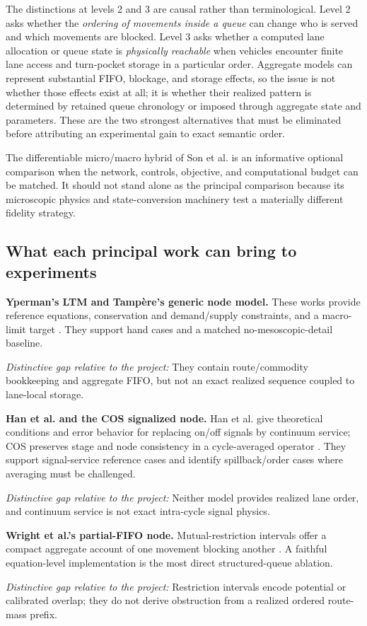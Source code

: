 \documentclass[11pt,a4paper]{article}
\newcommand{\gap}[1]{\par\smallskip\noindent\textit{Distinctive gap relative to the project:} #1}
\begin{document}
The distinctions at levels 2 and 3 are causal rather than terminological. Level 2 asks whether the \emph{ordering of movements inside a queue} can change who is served and which movements are blocked. Level 3 asks whether a computed lane allocation or queue state is \emph{physically reachable} when vehicles encounter finite lane access and turn-pocket storage in a particular order. Aggregate models can represent substantial FIFO, blockage, and storage effects, so the issue is not whether those effects exist at all; it is whether their realized pattern is determined by retained queue chronology or imposed through aggregate state and parameters. These are the two strongest alternatives that must be eliminated before attributing an experimental gain to exact semantic order.

The differentiable micro/macro hybrid of Son et al. \cite{son2022} is an informative optional comparison when the network, controls, objective, and computational budget can be matched. It should not stand alone as the principal comparison because its microscopic physics and state-conversion machinery test a materially different fidelity strategy.

\subsection{What each principal work can bring to experiments}

\textbf{Yperman's LTM and Tampère's generic node model.} These works provide reference equations, conservation and demand/supply constraints, and a macro-limit target \cite{yperman2007,tampere2011}. They support hand cases and a matched no-mesoscopic-detail baseline. \gap{They contain route/commodity bookkeeping and aggregate FIFO, but not an exact realized sequence coupled to lane-local storage.}

\textbf{Han et al. and the COS signalized node.} Han et al. give theoretical conditions and error behavior for replacing on/off signals by continuum service; COS preserves stage and node consistency in a cycle-averaged operator \cite{han2014,yahya2023}. They support signal-service reference cases and identify spillback/order cases where averaging must be challenged. \gap{Neither model provides realized lane order, and continuum service is not exact intra-cycle signal physics.}

\textbf{Wright et al.'s partial-FIFO node.} Mutual-restriction intervals offer a compact aggregate account of one movement blocking another \cite{wright2017}. A faithful equation-level implementation is the most direct structured-queue ablation. \gap{Restriction intervals encode potential or calibrated overlap; they do not derive obstruction from a realized ordered route-mass prefix.}
\end{document}
